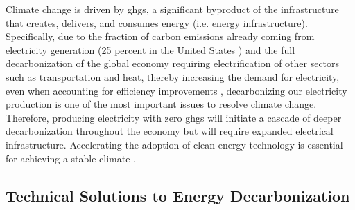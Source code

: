 Climate change is driven by \acp{ghg}, a significant byproduct of the
infrastructure that creates, delivers, and consumes energy (i.e. energy
infrastructure). Specifically, due to the fraction of carbon emissions already
coming from electricity generation (25 percent in the United States
\cite{us_epa_sources_2020}) and the full decarbonization of the global economy
requiring electrification of other sectors such as transportation and heat,
thereby increasing the demand for electricity, even when accounting for
efficiency improvements
\cite{national_academies_of_sciences_engineering_and_medicine_accelerating_2021,
mai_electrification_2018}, decarbonizing our electricity production is one of
the most important issues to resolve climate change. Therefore, producing
electricity with zero \acp{ghg} will initiate a cascade of deeper
decarbonization throughout the economy but will require expanded electrical
infrastructure. Accelerating the adoption of clean energy technology is
essential for achieving a stable climate \cite{roelfsema_taking_2020,
taylor_managing_2021}.

\subsection{Technical Solutions to Energy Decarbonization}

